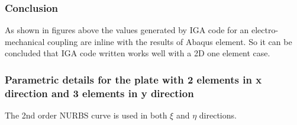 \documentclass[11pt]{article}
\begin{document}
\subsubsection{Conclusion}
As shown in figures above the values generated by IGA code for an electro-mechanical coupling are inline with the results of Abaqus element. So it can be concluded that IGA code written works well with a 2D one element case.

\subsubsection{Parametric details for the plate with 2 elements in x direction and  3 elements in y direction}
The 2nd order NURBS curve is used in both $\xi$ and $\eta$ directions. \\
\begin{comment}
The knot vectors along $\xi$ and $\eta$ directions are \\
$\Xi= [0,0,1,1]$ and $\eta= [0,0,1,1]$. \\
Control points along $\xi$ direction is given by \\
$n_{cp}(\xi)$ = total number of knots in $[\Xi] - (p+1) = 2$.\\
Similarly the total number of control points along $\eta$ direction is given
by\\ $n_{cp}(\eta)$ = total number of knots in $[H ]- (q+1) = 2$ . \\
The total number of control points which defines the surface is\\
$n_{cp}$ = $n_{cp}(\xi) * n_{cp}(\eta)$ which is $2*2 = 4$. \\
\end{comment}
\begin{comment}
\item Control points net for the geometry \\
P = [[[0,0,0,1],[L,0,0,1]],
[[0,L,0,1],[L,L,0,1]]]

$$
P = \begin{bmatrix}
[0,0,0,1] & [L,0,0,1] \\
[L,0,0,1] & [L,L,0,1] \\
\end{bmatrix} 
$$

\end{enumerate}
\end{comment}
\end{document}
